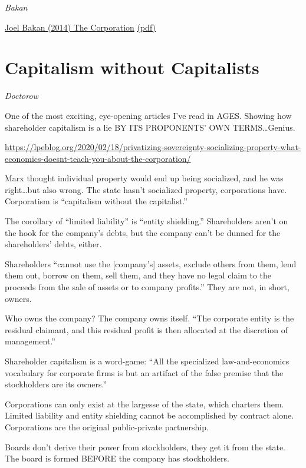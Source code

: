 \documentclass[
]{book}
\begin{document}
\emph{Bakan}

\href{https://archive.org/details/pdfy-4lBa31vI_yWrRdVi}{Joel Bakan (2014) The Corporation}
\href{pdf/Joel_Bakan_2014_The_Corporation.pdf}{(pdf)}

\hypertarget{capitalism-without-capitalists}{%
\section{Capitalism without Capitalists}\label{capitalism-without-capitalists}}

\emph{Doctorow}

One of the most exciting, eye-opening articles I've read in AGES. Showing how shareholder capitalism is a lie BY ITS PROPONENTS' OWN TERMS\ldots Genius.

\url{https://lpeblog.org/2020/02/18/privatizing-sovereignty-socializing-property-what-economics-doesnt-teach-you-about-the-corporation/}

Marx thought individual property would end up being socialized, and he was right\ldots but also wrong. The state hasn't socialized property, corporations have. Corporatism is ``capitalism without the capitalist.''

The corollary of ``limited liability'' is ``entity shielding.'' Shareholders aren't on the hook for the company's debts, but the company can't be dunned for the shareholders' debts, either.

Shareholders ``cannot use the {[}company's{]} assets, exclude others from them, lend them out, borrow on them, sell them, and they have no legal claim to the proceeds from the sale of assets or to company profits.'' They are not, in short, owners.

Who owns the company? The company owns itself. ``The corporate entity is the residual claimant, and this residual profit is then allocated at the discretion of management.''

Shareholder capitalism is a word-game: ``All the specialized law-and-economics vocabulary for corporate firms is but an artifact of the false premise that the stockholders are its owners.''

Corporations can only exist at the largesse of the state, which charters them. Limited liability and entity shielding cannot be accomplished by contract alone. Corporations are the original public-private partnership.

Boards don't derive their power from stockholders, they get it from the state. The board is formed BEFORE the company has stockholders.
\end{document}
